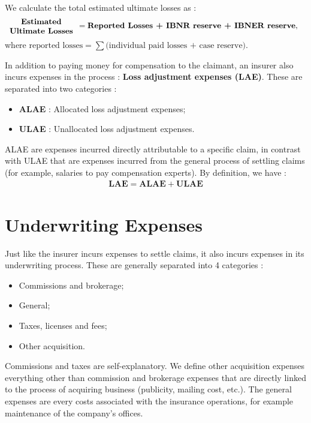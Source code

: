 \documentclass[11pt, english]{memoir}
\numberwithin{definition}{section}
\begin{document}
	
	\begin{tcolorbox}
		We calculate the total estimated ultimate losses as : 
		\begin{align*}
		\begin{minipage}{90pt}
		\begin{center}
		\textbf{Estimated Ultimate Losses}
		\end{center}
		\end{minipage}
		&= \textbf{Reported Losses + IBNR reserve + IBNER reserve},
		\end{align*}
		where $\text{reported losses} = \sum\big(\text{individual paid losses + case reserve}\big)$.
	\end{tcolorbox}
	
	
	In addition to paying money for compensation to the claimant, an insurer also incurs expenses in the process : \textbf{Loss adjustment expenses (LAE)}. These are separated into two categories : 
	\begin{itemize}
		\item \textbf{ALAE} : Allocated loss adjustment expenses;
		\item \textbf{ULAE} : Unallocated loss adjustment expenses.
	\end{itemize}
	ALAE are expenses incurred directly attributable to a specific claim, in contrast with ULAE that are expenses incurred from the general process of settling claims (for example, salaries to pay compensation experts). By definition, we have :
	\begin{align*}
	\textbf{LAE} = \textbf{ALAE} + \textbf{ULAE}
	\end{align*}
	
	\section{Underwriting Expenses}
	Just like the insurer incurs expenses to settle claims, it also incurs expenses in its underwriting process. These are generally separated into 4 categories : 
	\begin{itemize}
		\item Commissions and brokerage;
		\item General;
		\item Taxes, licenses and fees;
		\item Other acquisition.
	\end{itemize}
	
	Commissions and taxes are self-explanatory. We define other acquisition expenses everything other than commission and brokerage expenses that are directly linked to the process of acquiring business (publicity, mailing cost, etc.). The general expenses are every costs associated with the insurance operations, for example maintenance of the company's offices. 
	
\end{document}
